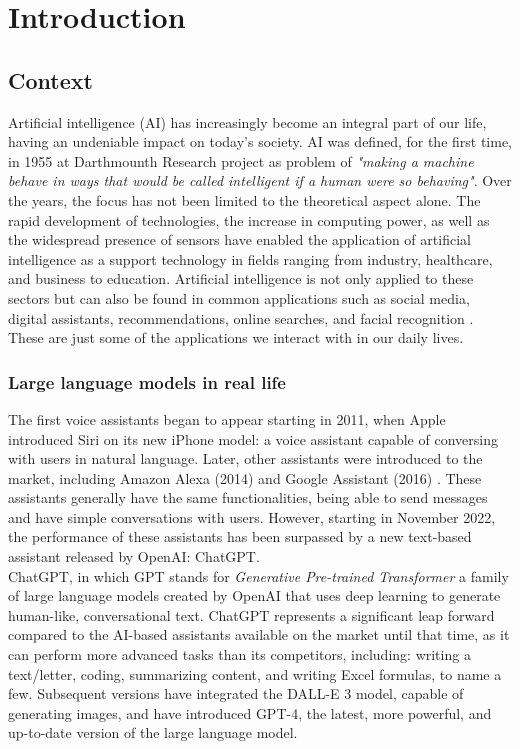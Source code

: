 \chapter{Introduction}
\section{Context}
Artificial intelligence (AI) has increasingly become an integral part of our life, having an undeniable impact on today’s society. 
AI was defined, for the first time, in 1955 at Darthmounth Research project as problem of \textit{"making a machine behave in ways that would be called intelligent if a human were so behaving"}\cite{kaplan2019siri}. 
Over the years, the focus has not been limited to the theoretical aspect alone. The rapid development of technologies, the increase in computing power, as well as the widespread presence of sensors have enabled the application of artificial intelligence as a support technology in fields ranging from industry, healthcare, and business to education. \cite{busnatu2022clinical}
Artificial intelligence is not only applied to these sectors but can also be found in common applications such as social media, digital assistants, recommendations, online searches, and facial recognition \cite{ref1}. These are just some of the applications we interact with in our daily lives.

\subsection{Large language models in real life}
The first voice assistants began to appear starting in 2011, when Apple introduced Siri on its new iPhone model: a voice assistant capable of conversing with users in natural language. Later, other assistants were introduced to the market, including Amazon Alexa (2014) and Google Assistant (2016) \cite{ref2}. These assistants generally have the same functionalities, being able to send messages and have simple conversations with users. However, starting in November 2022, the performance of these assistants has been surpassed by a new text-based assistant released by OpenAI: ChatGPT.\\
ChatGPT, in which GPT stands for \textit{Generative Pre-trained Transformer} a family of large language models created by OpenAI that uses deep learning to generate human-like, conversational text. 
ChatGPT represents a significant leap forward compared to the AI-based assistants available on the market until that time, as it can perform more advanced tasks than its competitors, including: writing a text/letter, coding, summarizing content, and writing Excel formulas, to name a few. Subsequent versions have integrated the DALL-E 3 model, capable of generating images, and have introduced GPT-4, the latest, more powerful, and up-to-date version of the large language model. \cite{ref3}

